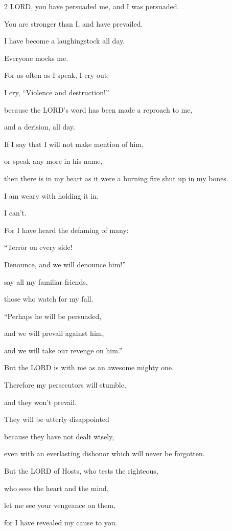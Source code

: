 \vspace{\baselineskip}

\begin{multicols}{2}
\myverse{}LORD, you have persuaded me, and I was persuaded.

You are stronger than I, and have prevailed.

I have become a laughingstock all day.

Everyone mocks me.


\myverse{}For as often as I speak, I cry out;

I cry, “Violence and destruction!”

because the LORD’s word has been made a reproach to me,

and a derision, all day.


\myverse{}If I say that I will not make mention of him,

or speak any more in his name,

then there is in my heart as it were a burning fire shut up in my bones.

I am weary with holding it in.

I can’t.


\myverse{}For I have heard the defaming of many:

“Terror on every side!

Denounce, and we will denounce him!”

say all my familiar friends,

those who watch for my fall.

“Perhaps he will be persuaded,

and we will prevail against him,

and we will take our revenge on him.”


\myverse{}But the LORD is with me as an awesome mighty one.

Therefore my persecutors will stumble,

and they won’t prevail.

They will be utterly disappointed

because they have not dealt wisely,

even with an everlasting dishonor which will never be forgotten.


\myverse{}But the LORD of Hosts, who tests the righteous,

who sees the heart and the mind,

let me see your vengeance on them,

for I have revealed my cause to you.



\end{multicols}
